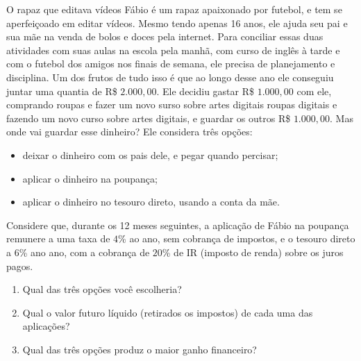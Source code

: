 

\begin{task}{O rapaz que editava vídeos}
Fábio é um rapaz apaixonado por futebol, e tem se aperfeiçoado em editar vídeos. Mesmo tendo apenas 16 anos, ele ajuda seu pai e sua mãe na venda de bolos e doces pela internet. Para conciliar essas duas atividades com suas aulas na escola pela manhã, com curso de inglês à tarde e com o futebol dos amigos nos finais de semana, ele precisa de planejamento e disciplina. Um dos frutos de tudo isso é que ao longo desse ano ele conseguiu juntar uma quantia de R\$ $2.000{,}00$. Ele decidiu gastar R\$ $1.000{,}00$ com ele, comprando roupas e fazer um novo surso sobre artes digitais roupas digitais e fazendo um novo curso sobre artes digitais, e guardar os outros R\$ $1.000{,}00$. Mas onde vai guardar esse dinheiro? Ele considera três opções:
\begin{itemize}
  \item deixar o dinheiro com os pais dele, e pegar quando percisar;
  \item aplicar o dinheiro na poupança;
  \item aplicar o dinheiro no tesouro direto, usando a conta da mãe.
\end{itemize}

Considere que, durante os 12 meses seguintes, a aplicação de Fábio na poupança remunere a uma taxa de $4$\% ao ano, sem cobrança de impostos, e o tesouro direto a $6$\% ano ano, com a cobrança de $20$\% de IR (imposto de renda) sobre os juros pagos.

\begin{enumerate}
  \item Qual das três opções você escolheria?
  \item Qual o valor futuro líquido (retirados os impostos) de cada uma das aplicações?
  \item Qual das três opções produz o maior ganho financeiro?
\end{enumerate}
\end{task}

